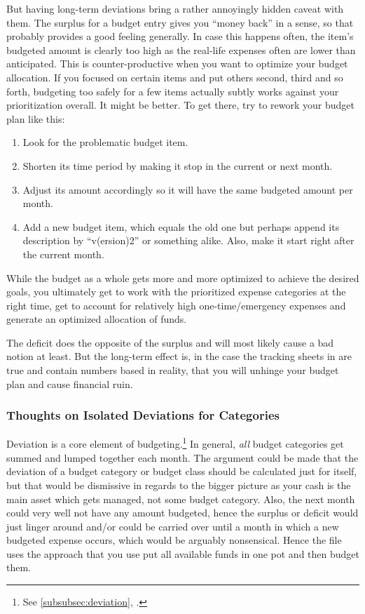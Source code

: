 But having long-term deviations bring a rather annoyingly hidden caveat with them.
The surplus for a budget entry gives you ``money back'' in a sense, so that probably provides a good feeling generally.
In case this happens often, the item's budgeted amount is clearly too high as the real-life expenses often are lower than anticipated.
This is counter-productive when you want to optimize your budget allocation.
If you focused on certain items and put others second, third and so forth, budgeting too safely for a few items actually subtly works against your prioritization overall.
It might be better.
To get there, try to rework your budget plan like this:
\begin{enumerate}
	\item Look for the problematic budget item.
	\item Shorten its time period by making it stop in the current or next month.
	\item Adjust its amount accordingly so it will have the same budgeted amount per month.
	\item Add a new budget item, which equals the old one but perhaps append its description by ``v(ersion)2'' or something alike.
	Also, make it start right after the current month.
\end{enumerate}

While the budget as a whole gets more and more optimized to achieve the desired goals, you ultimately get to work with the prioritized expense categories at the right time, get to account for relatively high one-time/emergency expenses and generate an optimized allocation of funds.

The deficit does the opposite of the surplus and will most likely cause a bad notion at least.
But the long-term effect is, in the case the tracking sheets in \tfn are true and contain numbers based in reality, that you will unhinge your budget plan and cause financial ruin.

\subsubsection{Thoughts on Isolated Deviations for Categories}
\label{subsubsec:thoughts-on-isolated-deviations-for-categories}

Deviation is a core element of budgeting.\footnote{See \autoref{subsubsec:deviation}, .}
In general, \emph{all} budget categories get summed and lumped together each month.
The argument could be made that the deviation of a budget category or budget class should be calculated just for itself, but that would be dismissive in regards to the bigger picture as your cash is the main asset which gets managed, not some budget category.
Also, the next month could very well not have any amount budgeted, hence the surplus or deficit would just linger around and/or could be carried over until a month in which a new budgeted expense occurs, which would be arguably nonsensical.
Hence the file uses the approach that you use put all available funds in one pot and then budget them.

